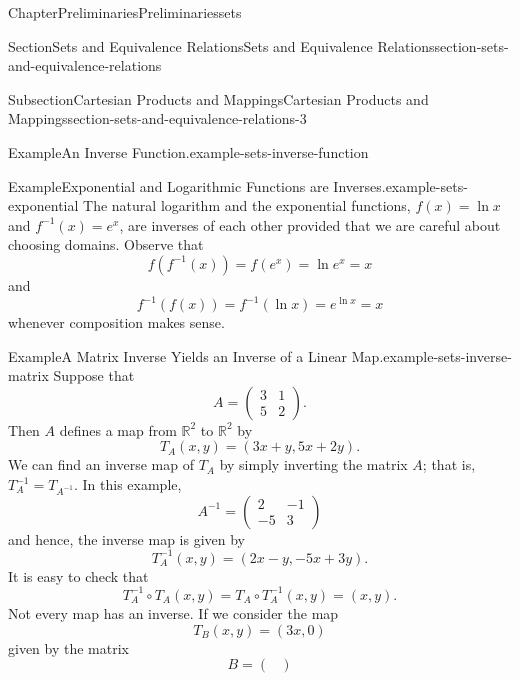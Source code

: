\documentclass[oneside,10pt,]{book}
\numberwithin{equation}{section}
\begin{document}
\begin{chapterptx}{Chapter}{Preliminaries}{}{Preliminaries}{}{}{sets}
\begin{sectionptx}{Section}{Sets and Equivalence Relations}{}{Sets and Equivalence Relations}{}{}{section-sets-and-equivalence-relations}
\begin{subsectionptx}{Subsection}{Cartesian Products and Mappings}{}{Cartesian Products and Mappings}{}{}{section-sets-and-equivalence-relations-3}
\begin{example}{Example}{An Inverse Function.}{example-sets-inverse-function}
\end{example}
\begin{example}{Example}{Exponential and Logarithmic Functions are Inverses.}{example-sets-exponential}%
The natural logarithm and the exponential functions, \(f(x) = \ln x\) and \(f^{-1}(x) = e^x\), are inverses of each other provided that we are careful about choosing domains.  Observe that%
\begin{equation*}
f(f^{-1}(x)) = f(e^x) = \ln e^x = x
\end{equation*}
and%
\begin{equation*}
f^{-1}(f(x)) = f^{-1}(\ln x) = e^{\ln x} = x
\end{equation*}
whenever composition makes sense.%
\end{example}
\begin{example}{Example}{A Matrix Inverse Yields an Inverse of a Linear Map.}{example-sets-inverse-matrix}%
Suppose that%
\begin{equation*}
A =
\begin{pmatrix}
3 & 1 \\
5 & 2
\end{pmatrix}\text{.}
\end{equation*}
Then \(A\) defines a map from \({\mathbb R}^2\) to \({\mathbb R}^2\) by%
\begin{equation*}
T_A (x,y) = (3x +  y, 5x + 2y)\text{.}
\end{equation*}
We can find an inverse map of \(T_A\) by simply inverting the matrix \(A\); that is, \(T_A^{-1} = T_{A^{-1}}\). In this example,%
\begin{equation*}
A^{-1} =
\begin{pmatrix}
2  & -1 \\
-5 &  3
\end{pmatrix}
\end{equation*}
and hence, the inverse map is given by%
\begin{equation*}
T_A^{-1} (x,y) = (2x -  y, -5x + 3y)\text{.}
\end{equation*}
It is easy to check that%
\begin{equation*}
T^{-1}_A \circ T_A (x,y) = T_A \circ T_A^{-1} (x,y) = (x,y)\text{.}
\end{equation*}
Not every map has an inverse.  If we consider the map%
\begin{equation*}
T_B (x,y) = (3x , 0 )
\end{equation*}
given by the matrix%
\begin{equation*}
B =
\begin{pmatrix}

\end{pmatrix}
\end{equation*}
\end{example}
\end{subsectionptx}
\end{sectionptx}
\end{chapterptx}
\end{document}

